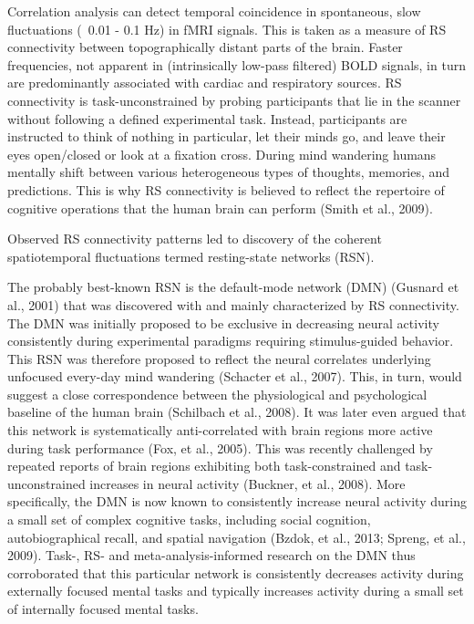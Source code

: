 \documentclass[authoryear,review,3p]{elsarticle}
\begin{document}
Correlation analysis can detect temporal coincidence in spontaneous, slow fluctuations (~0.01 - 0.1 Hz) in fMRI signals. This is taken as a measure of RS connectivity between topographically distant parts of the brain. Faster frequencies, not apparent in (intrinsically low-pass filtered) BOLD signals, in turn are predominantly associated with cardiac and respiratory sources. RS connectivity is task-unconstrained by probing participants that lie in the scanner without following a defined experimental task. Instead, participants are instructed to think of nothing in particular, let their minds go, and leave their eyes open/closed or look at a fixation cross. During mind wandering humans mentally shift between various heterogeneous types of thoughts, memories, and predictions. This is why RS connectivity is believed to reflect the repertoire of cognitive operations that the human brain can perform (Smith et al., 2009).


Observed RS connectivity patterns led to discovery of the coherent spatiotemporal fluctuations termed resting-state networks (RSN).

The probably best-known RSN is the default-mode network (DMN) (Gusnard et al., 2001) that was discovered with and mainly characterized by RS connectivity. The DMN was initially proposed to be exclusive in decreasing neural activity consistently during experimental paradigms requiring stimulus-guided behavior. This RSN was therefore proposed to reflect the neural correlates underlying unfocused every-day mind wandering (Schacter et al., 2007). This, in turn, would suggest a close correspondence between the physiological and psychological baseline of the human brain (Schilbach et al., 2008). It was later even argued that this network is systematically anti-correlated with brain regions more active during task performance (Fox, et al., 2005). This was recently challenged by repeated reports of brain regions exhibiting both task-constrained and task-unconstrained increases in neural activity (Buckner, et al., 2008). More specifically, the DMN is now known to consistently increase neural activity during a small set of complex cognitive tasks, including social cognition, autobiographical recall, and spatial navigation (Bzdok, et al., 2013; Spreng, et al., 2009). Task-, RS- and meta-analysis-informed research on the DMN thus corroborated that this particular network is consistently decreases activity during externally focused mental tasks and typically increases activity during a small set of internally focused mental tasks.
\end{document}
